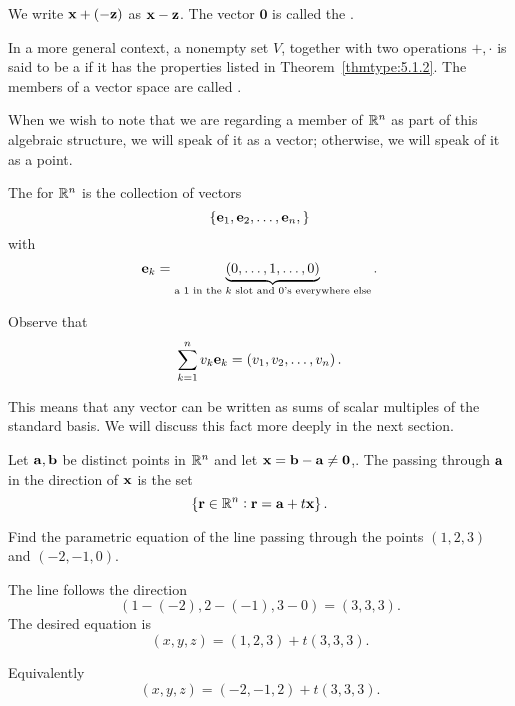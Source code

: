 We  write $\mathbf{ x}+(-\mathbf{ z})$  as
$\mathbf{ x}-\mathbf{ z}$. The vector $\mathbf{0}$ is called the .



In a more general context, a nonempty set $V$,
together with
two operations  $+,\cdot$ is
said to be a  if it has the
properties listed
in Theorem~\ref{thmtype:5.1.2}. The members of a vector space are called
.



When we wish to note that we  are
regarding a
member of $\mathbb{R}^n$ as part of this algebraic structure, we will
speak of it as a vector; otherwise, we will speak of it as a point. 


\begin{df}
The  for $\mathbb{R}^n$ is the collection of
vectors
$$\{\mathbf{ e}_1, \mathbf{ e}_2,\ldots,
\mathbf{ e}_n,\}$$ with
$$ \mathbf{ e}_k = \underbrace{\left(0,  \dots,  1, \dots,  0\right)}_{
\text{a $1$
in the $k$ slot and $0$'s everywhere else}}.$$ 
\end{df}

Observe that \begin{equation}
               \sum _{k = 1} ^n v_k\mathbf{ e}_k   =  \left(v_1,
v_2, \dots, v_n\right). \label{eq:span2}
             \end{equation}
             
This means that any vector can be written as sums of scalar multiples   of the standard basis. We will discuss this fact more deeply in the next section.           


\begin{df}
Let ${\mathbf a}, {\mathbf b}$ be distinct points in $\mathbb{R}^n$ and let $\mathbf{ x}={\mathbf b}-{\mathbf a}\neq
\mathbf{ 0}$,. The 
passing through ${\mathbf a}$ in the direction of $\mathbf{ x}$ is the
set
$$ \left\{{\mathbf r}\in\mathbb{R}^n:{\mathbf r}={\mathbf a}+t\mathbf{ x} \right\}. $$
\end{df}



\begin{exa}
Find the parametric equation of the line passing through the points $(1, 2, 3)$ and  $\left(-2, -1, 0\right)$.
\end{exa}
\begin{solu} The line follows the direction $$ \left(1 - (-2), 2 - (-1), 3 - 0\right) = \left(3, 3, 3\right).
$$ The desired equation is $$\left(x, y,  z\right) =  \left(1, 2, 3\right) + t\left(3, 3,  3\right).   $$

Equivalently 
$$\left(x, y,  z\right) =  \left(-2, -1, 2\right) + t\left(3, 3,  3\right).   $$
\end{solu}


